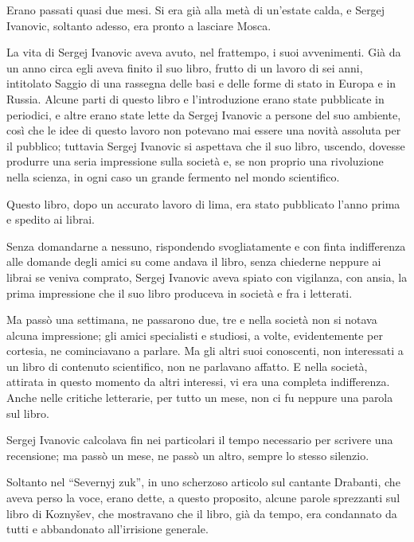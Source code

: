 \label{parte-ottava} 
\pagestyle{pagina}

Erano passati quasi due mesi. Si era già alla metà di un'estate calda, e Sergej Ivanovic, soltanto adesso, era pronto a lasciare Mosca. 

La vita di Sergej Ivanovic aveva avuto, nel frattempo, i suoi avvenimenti. Già da un anno circa egli aveva finito il suo libro, frutto di un lavoro di sei anni, intitolato Saggio di una rassegna delle basi e delle forme di stato in Europa e in Russia. Alcune parti di questo libro e l'introduzione erano state pubblicate in periodici, e altre erano state lette da Sergej Ivanovic a persone del suo ambiente, così che le idee di questo lavoro non potevano mai essere una novità assoluta per il pubblico; tuttavia Sergej Ivanovic si aspettava che il suo libro, uscendo, dovesse produrre una seria impressione sulla società e, se non proprio una rivoluzione nella scienza, in ogni caso un grande fermento nel mondo scientifico. 

Questo libro, dopo un accurato lavoro di lima, era stato pubblicato l'anno prima e spedito ai librai. 

Senza domandarne a nessuno, rispondendo svogliatamente e con finta indifferenza alle domande degli amici su come andava il libro, senza chiederne neppure ai librai se veniva comprato, Sergej Ivanovic aveva spiato con vigilanza, con ansia, la prima impressione che il suo libro produceva in società e fra i letterati. 

Ma passò una settimana, ne passarono due, tre e nella società non si notava alcuna impressione; gli amici specialisti e studiosi, a volte, evidentemente per cortesia, ne cominciavano a parlare. Ma gli altri suoi conoscenti, non interessati a un libro di contenuto scientifico, non ne parlavano affatto. E nella società, attirata in questo momento da altri interessi, vi era una completa indifferenza. Anche nelle critiche letterarie, per tutto un mese, non ci fu neppure una parola sul libro. 

Sergej Ivanovic calcolava fin nei particolari il tempo necessario per scrivere una recensione; ma passò un mese, ne passò un altro, sempre lo stesso silenzio. 

Soltanto nel ``Severnyj zuk'', in uno scherzoso articolo sul cantante Drabanti, che aveva perso la voce, erano dette, a questo proposito, alcune parole sprezzanti sul libro di Koznyšev, che mostravano che il libro, già da tempo, era condannato da tutti e abbandonato all'irrisione generale. 

